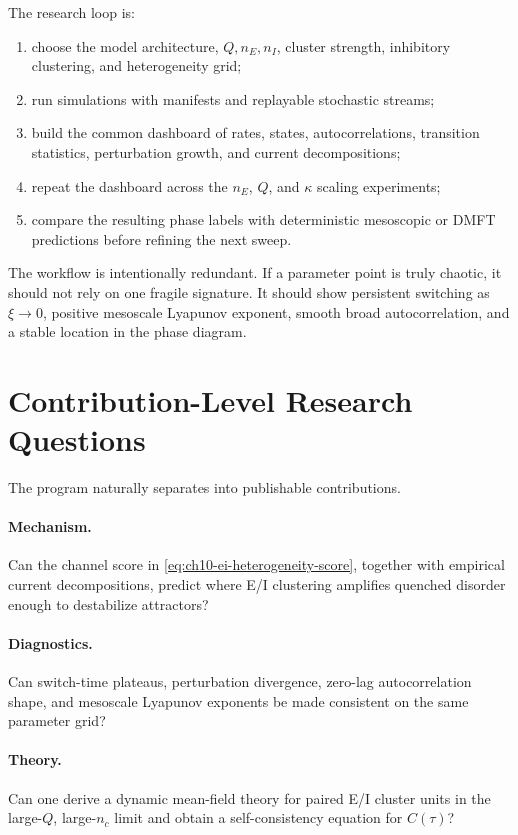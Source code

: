 The research loop is:
\begin{enumerate}
    \item choose the model architecture, \(Q,n_E,n_I\), cluster strength,
    inhibitory clustering, and heterogeneity grid;
    \item run simulations with manifests and replayable stochastic streams;
    \item build the common dashboard of rates, states, autocorrelations,
    transition statistics, perturbation growth, and current decompositions;
    \item repeat the dashboard across the \(n_E\), \(Q\), and \(\kappa\)
    scaling experiments;
    \item compare the resulting phase labels with deterministic mesoscopic or
    DMFT predictions before refining the next sweep.
\end{enumerate}

The workflow is intentionally redundant. If a parameter point is truly chaotic,
it should not rely on one fragile signature. It should show persistent switching
as \(\xi\to 0\), positive mesoscale Lyapunov exponent, smooth broad
autocorrelation, and a stable location in the phase diagram.

\section{Contribution-Level Research Questions}
\label{sec:ch10-contribution-questions}

The program naturally separates into publishable contributions.

\paragraph{Mechanism.}
Can the channel score in \eqref{eq:ch10-ei-heterogeneity-score}, together with
empirical current decompositions, predict where E/I clustering amplifies
quenched disorder enough to destabilize attractors?

\paragraph{Diagnostics.}
Can switch-time plateaus, perturbation divergence, zero-lag autocorrelation
shape, and mesoscale Lyapunov exponents be made consistent on the same
parameter grid?

\paragraph{Theory.}
Can one derive a dynamic mean-field theory for paired E/I cluster units in the
large-\(Q\), large-\(n_c\) limit and obtain a self-consistency equation for
\(C(\tau)\)?

